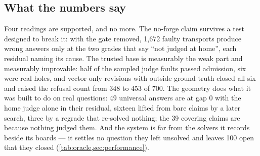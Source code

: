 \subsection{What the numbers say}
\label{sec:reading}

Four readings are supported, and no more. The no-forge claim
survives a test designed to break it: with the gate removed, 1,672
faulty transports produce wrong answers only at the two grades that
say ``not judged at home'', each residual naming its cause. The
trusted base is measurably the weak
part and measurably improvable: half of the sampled judge faults
passed admission, six were real holes, and vector-only revisions with
outside ground truth closed all six and raised the refusal count from
348 to 453 of 700. The geometry does what it was built to do on real
questions: 49 universal answers are  at gap 0 with
the home judge alone in their residual, sixteen lifted from bare
claims by a later search, three by a regrade that re-solved nothing;
the 39 covering claims are  because nothing judged
them. And the system is far from the solvers
it records beside its boards --- it settles no question they left
unsolved and leaves 100 open that they closed
(\cref{tab:oracle,sec:performance}).
